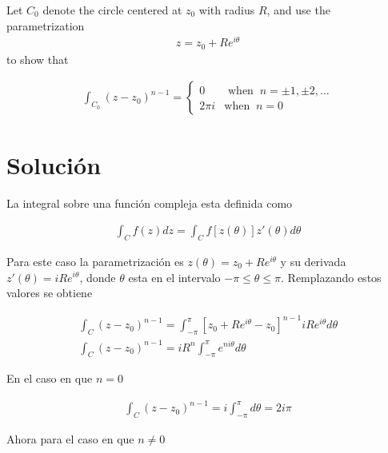 \begin{problem}{2}
    Let $C_0$ denote the circle centered at $z_0$ with radius $R$, and use the parametrization
    \begin{gather*}
        z = z_0 + Re^{i\theta}
    \end{gather*}
    to show that 

    \begin{gather*}
        \int_{C_0} (z - z_0)^{n-1} = 
        \left\{\begin{matrix}
            0 & \text{ when} \;\; n = \pm 1,\pm 2, \dots \\
            2\pi i & \text{when} \;\; n = 0          
        \end{matrix}\right.
    \end{gather*}
\end{problem}

\section*{Solución}

La integral sobre una función compleja esta definida como 

\begin{gather*}
    \int_C f(z)dz = \int_C f[z(\theta)]z'(\theta)d\theta
\end{gather*}

Para este caso la parametrización es $z(\theta) = z_0 + Re^{i\theta}$ y su derivada $z'(\theta) = iRe^{i\theta}$, donde $\theta$ esta en el intervalo $-\pi \leq \theta \leq \pi$. Remplazando estos valores se obtiene 

\begin{gather*}
    \int_C (z - z_0)^{n-1} = \int_{-\pi}^{\pi} [z_0 + Re^{i\theta} - z_0]^{n-1} iRe^{i\theta}d\theta\\
    \int_C (z - z_0)^{n-1} = iR^{n}\int_{-\pi}^{\pi} e^{ni\theta} d\theta
\end{gather*}

En el caso en que $n = 0$ 

\begin{mdframed}
    \vspace{-0.25cm}
    \begin{gather}
        \int_C (z - z_0)^{n-1} = i\int_{-\pi}^{\pi} d\theta = 2i\pi
    \end{gather}
    \vspace{-0.3cm}
\end{mdframed}

Ahora para el caso en que $n \neq 0$ 

